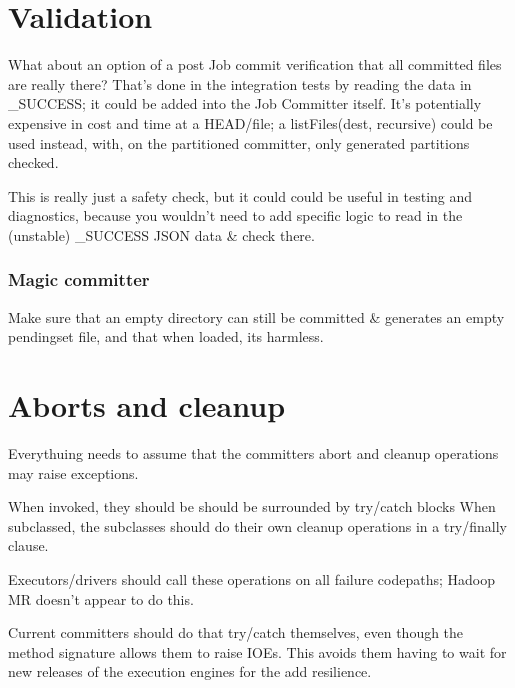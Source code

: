 \documentclass{article}
\begin{document}
\section{Validation}

What about an option of a post Job commit verification that all committed files
are really there?
That's done in the integration tests by reading the data in _SUCCESS;
it could be added into the Job Committer itself.
It's potentially expensive in cost and time at a HEAD/file;
a listFiles(dest, recursive) could be used instead, with, on the partitioned
committer, only generated partitions checked.

This is really just a safety check, but it could could be useful in testing
and diagnostics, because you wouldn't need to add specific logic to read in
the (unstable) _SUCCESS JSON data & check there.

\subsubsection{Magic committer}

Make sure that an empty directory can still be committed & generates
an empty pendingset  file, and that when loaded, its harmless.



\section{Aborts and cleanup}

Everythuing needs to assume that the committers abort and cleanup operations may raise exceptions.

When invoked, they should be should be surrounded by try/catch blocks When subclassed, the subclasses
should do their own cleanup operations in a try/finally clause.

Executors/drivers should call these operations on all failure codepaths;
Hadoop MR doesn't appear to do this.

Current committers should do that try/catch themselves, even though the method
signature allows them to raise IOEs.
This avoids them having to wait for new releases of the execution engines
for the add resilience.
\end{document}
